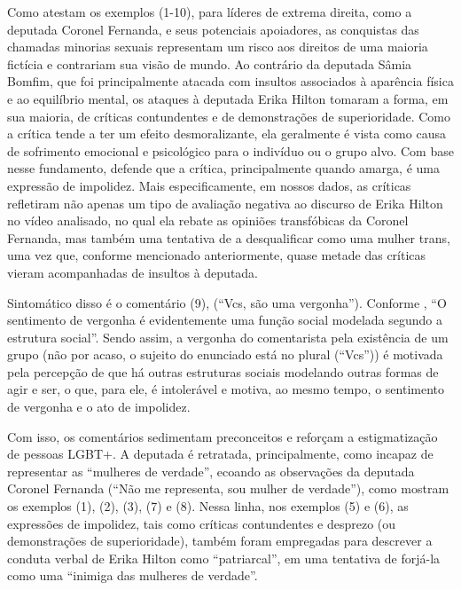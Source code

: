 \documentclass[portuguese]{textolivre}
\begin{document}
Como atestam os exemplos (1-10), para líderes de extrema direita, como a deputada Coronel Fernanda, e seus potenciais apoiadores, as conquistas das chamadas minorias sexuais representam um risco aos direitos de uma maioria fictícia e contrariam sua visão de mundo. Ao contrário da deputada Sâmia Bomfim, que foi principalmente atacada com insultos associados à aparência física e ao equilíbrio mental, os ataques à deputada Erika Hilton tomaram a forma, em sua maioria, de críticas contundentes e de demonstrações de superioridade. Como a crítica tende a ter um efeito desmoralizante, ela geralmente é vista como causa de sofrimento emocional e psicológico para o indivíduo ou o grupo alvo. Com base nesse fundamento, \textcite{culpeper2010, culpeper2011} defende que a crítica, principalmente quando amarga, é uma expressão de impolidez. Mais especificamente, em nossos dados, as críticas refletiram não apenas um tipo de avaliação negativa ao discurso de Erika Hilton no vídeo analisado, no qual ela rebate as opiniões transfóbicas da Coronel Fernanda, mas também uma tentativa de a desqualificar como uma mulher trans, uma vez que, conforme mencionado anteriormente, quase metade das críticas vieram acompanhadas de insultos à deputada.

Sintomático disso é o comentário (9), (``Vcs, são uma vergonha''). Conforme \textcite[p. 138]{elias2011}, ``O sentimento de vergonha é evidentemente uma função social modelada segundo a estrutura social''. Sendo assim, a vergonha do comentarista pela existência de um grupo (não por acaso, o sujeito do enunciado está no plural (``Vcs'')) é motivada pela percepção de que há outras estruturas sociais modelando outras formas de agir e ser, o que, para ele, é intolerável e motiva, ao mesmo tempo, o sentimento de vergonha e o ato de impolidez.

Com isso, os comentários sedimentam preconceitos e reforçam a estigmatização de pessoas LGBT+. A deputada é retratada, principalmente, como incapaz de representar as ``mulheres de verdade'', ecoando as observações da deputada Coronel Fernanda (``Não me representa, sou mulher de verdade''), como mostram os exemplos (1), (2), (3), (7) e (8). Nessa linha, nos exemplos (5) e (6), as expressões de impolidez, tais como críticas contundentes e desprezo (ou demonstrações de superioridade), também foram empregadas para descrever a conduta verbal de Erika Hilton como ``patriarcal'', em uma tentativa de forjá-la como uma ``inimiga das mulheres de verdade''.
\end{document}

